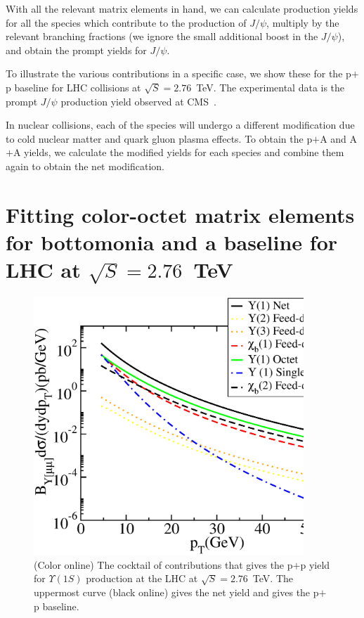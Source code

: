 \documentclass[article,showpacs,preprintnumbers,amsmath,amssymb]{revtex4}
\begin{document}
\begin{appendix}
With all the relevant matrix elements in hand, we can calculate production
yields for all the species which contribute to the production of $J/\psi$,
multiply by the relevant branching fractions (we ignore the small additional
boost in the $J/\psi$), and obtain the prompt yields for $J/\psi$. 

To illustrate the various contributions in a specific case, we show these for
the p$+$p baseline for LHC collisions at $\sqrt{S}=2.76$~TeV. The experimental
data is the prompt $J/\psi$ production yield observed at
CMS~\cite{Chatrchyan:2012np}.

In nuclear collisions, each of the species will undergo a different
modification due to cold nuclear matter and quark gluon plasma effects. To
obtain the p$+$A and A$+$A yields, we calculate the modified yields for each
species and combine them again to obtain the net modification. 

\section{Fitting color-octet matrix elements for bottomonia and a baseline for 
LHC at $\sqrt{S}=2.76$~TeV~\label{appendix:LHCbaseU}}
\begin{figure}[!ht]
\vspace*{.2in}
\includegraphics[width=4.0in,angle=0]{fig26_lhc2760ppupsiloncocktail.eps} 
\caption{(Color online) The cocktail of contributions that  gives the p$+$p
yield for $\Upsilon(1S)$ production at the LHC at $\sqrt{S}=2.76$~TeV. The uppermost
curve (black online) gives the net yield and gives the p$+$p baseline. ~\label{fig:LHC2760Ucocktail}}
\end{figure}


\end{appendix}
\end{document}

